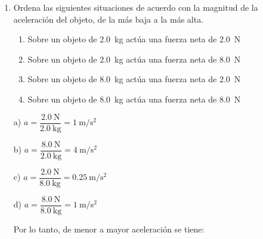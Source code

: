 \documentclass[14pt]{extarticle}
\begin{document}
\begin{enumerate}
\item Ordena las siguientes situaciones de acuerdo con la magnitud de la aceleración del objeto, de la más baja a la más alta.
\begin{enumerate}[label=\alph*)]
\item Sobre un objeto de \SI{2.0}{\kilo\gram} actúa una fuerza neta de \SI{2.0}{\newton}
\item Sobre un objeto de \SI{2.0}{\kilo\gram} actúa una fuerza neta de \SI{8.0}{\newton}
\item Sobre un objeto de \SI{8.0}{\kilo\gram} actúa una fuerza neta de \SI{2.0}{\newton}
\item Sobre un objeto de \SI{8.0}{\kilo\gram} actúa una fuerza neta de \SI{8.0}{\newton}
\end{enumerate}
a) $a = \dfrac{\SI{2.0}{\newton}}{\SI{2.0}{\kilo\gram}} = \SI{1}{\meter\per\square\second}$

b) $a = \dfrac{\SI{8.0}{\newton}}{\SI{2.0}{\kilo\gram}} = \SI{4}{\meter\per\square\second}$

c) $a = \dfrac{\SI{2.0}{\newton}}{\SI{8.0}{\kilo\gram}} = \SI{0.25}{\meter\per\square\second}$

d) $a = \dfrac{\SI{8.0}{\newton}}{\SI{8.0}{\kilo\gram}} = \SI{1}{\meter\per\square\second}$

Por lo tanto, de menor a mayor aceleración se tiene:


\end{enumerate}
\end{document}
